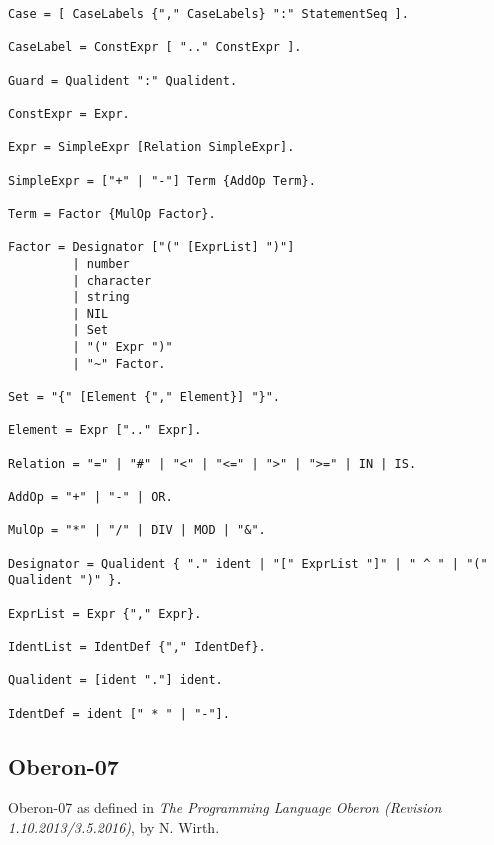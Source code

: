 \documentclass[12pt]{article}
\begin{document}
{\begin{lstlisting}[style=EBNF]
Case = [ CaseLabels {"," CaseLabels} ":" StatementSeq ].

CaseLabel = ConstExpr [ ".." ConstExpr ].

Guard = Qualident ":" Qualident.

ConstExpr = Expr.

Expr = SimpleExpr [Relation SimpleExpr].

SimpleExpr = ["+" | "-"] Term {AddOp Term}.

Term = Factor {MulOp Factor}.

Factor = Designator ["(" [ExprList] ")"] 
         | number 
         | character 
         | string 
         | NIL 
         | Set 
         | "(" Expr ")" 
         | "~" Factor. 

Set = "{" [Element {"," Element}] "}".

Element = Expr [".." Expr].

Relation = "=" | "#" | "<" | "<=" | ">" | ">=" | IN | IS.

AddOp = "+" | "-" | OR.

MulOp = "*" | "/" | DIV | MOD | "&".

Designator = Qualident { "." ident | "[" ExprList "]" | " ^ " | "(" Qualident ")" }. 

ExprList = Expr {"," Expr}.

IdentList = IdentDef {"," IdentDef}.

Qualident = [ident "."] ident.

IdentDef = ident [" * " | "-"].
\end{lstlisting}}

\subsection{Oberon-07}

Oberon-07 as defined in {\em The Programming Language Oberon (Revision 1.10.2013/3.5.2016)}, by N. Wirth.
\end{document}
